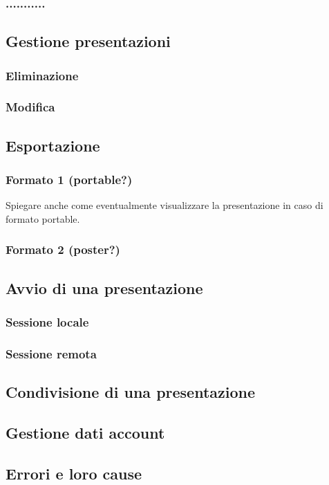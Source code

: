 \subsubsection{...........}

\subsection{Gestione presentazioni}
\subsubsection{Eliminazione}
\subsubsection{Modifica}

\subsection{Esportazione}
\subsubsection{Formato 1 (portable?)}
Spiegare anche come eventualmente visualizzare la presentazione in caso di formato portable.
\subsubsection{Formato 2 (poster?)}

\subsection{Avvio di una presentazione}
\subsubsection{Sessione locale}
\subsubsection{Sessione remota}

\subsection{Condivisione di una presentazione}

\subsection{Gestione dati account}

\subsection{Errori e loro cause}


